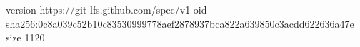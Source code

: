 version https://git-lfs.github.com/spec/v1
oid sha256:0c8a039c52b10c83530999778aef2878937bca822a639850c3acdd622636a47e
size 1120
